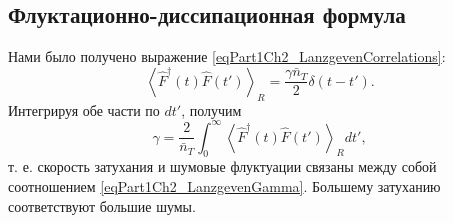 \subsection{Флуктационно-диссипационная формула}
Нами было получено выражение \eqref{eqPart1Ch2_LanzgevenCorrelations}:
\begin{equation}
\left<\hat{F}^{\dag}\left(t\right)\hat{F}\left(t'\right)\right>_R = 
\frac{\gamma \bar{n}_{T}}{2} \delta\left(t - t'\right).
\nonumber
\end{equation}
Интегрируя обе части по $d t'$, получим
\begin{equation}
\gamma =
\frac{2}{\bar{n}_T}\int_0^{\infty}\left<\hat{F}^{\dag}\left(t\right)\hat{F}\left(t'\right)\right>_R
d t',
\label{eqPart1Ch2_LanzgevenGamma}
\end{equation}
т. е. скорость затухания и шумовые флуктуации связаны между собой
соотношением \eqref{eqPart1Ch2_LanzgevenGamma}. Большему затуханию
соответствуют большие шумы.
